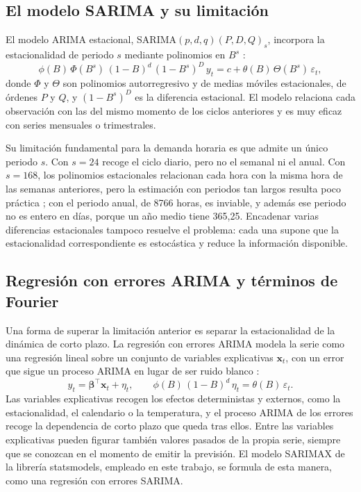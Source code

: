 \subsection{El modelo SARIMA y su limitación}\label{sec:sarima}

El modelo ARIMA estacional, SARIMA$(p,d,q)(P,D,Q)_s$, incorpora la
estacionalidad de periodo $s$ mediante polinomios en $B^s$
\parencite{box2015time}:
\begin{equation}
	\phi(B)\, \Phi(B^s)\, (1 - B)^d\, (1 - B^s)^D\, y_t = c + \theta(B)\, \Theta(B^s)\, \varepsilon_t,
\end{equation}
donde $\Phi$ y $\Theta$ son polinomios autorregresivo y de medias móviles
estacionales, de órdenes $P$ y $Q$, y $(1 - B^s)^D$ es la diferencia
estacional. El modelo relaciona cada observación con las del mismo momento
de los ciclos anteriores y es muy eficaz con series mensuales o trimestrales.

Su limitación fundamental para la demanda horaria es que admite un único
periodo $s$. Con $s = 24$ recoge el ciclo diario, pero no el semanal ni el
anual. Con $s = 168$, los polinomios estacionales relacionan cada hora con la
misma hora de las semanas anteriores, pero la estimación con periodos tan
largos resulta poco práctica \parencite{hyndman2021fpp3}; con el periodo
anual, de 8766 horas, es inviable, y además ese periodo no es entero en
días, porque un año medio tiene 365,25. Encadenar varias diferencias
estacionales tampoco resuelve el problema: cada una supone que la
estacionalidad correspondiente es estocástica y reduce la información
disponible.

\subsection{Regresión con errores ARIMA y términos de Fourier}\label{sec:fourier}

Una forma de superar la limitación anterior es separar la estacionalidad de
la dinámica de corto plazo. La regresión con errores ARIMA modela la serie
como una regresión lineal sobre un conjunto de variables explicativas
$\mathbf{x}_t$, con un error que sigue un proceso ARIMA en lugar de ser ruido
blanco \parencite{hyndman2021fpp3}:
\begin{equation}
	y_t = \boldsymbol{\beta}^{\top} \mathbf{x}_t + \eta_t,
	\qquad \phi(B)\, (1-B)^d\, \eta_t = \theta(B)\, \varepsilon_t.
\end{equation}
Las variables explicativas recogen los efectos deterministas y externos,
como la estacionalidad, el calendario o la temperatura, y el proceso ARIMA
de los errores recoge la dependencia de corto plazo que queda tras ellos.
Entre las variables explicativas pueden figurar también valores pasados de
la propia serie, siempre que se conozcan en el momento de emitir la
previsión. El modelo SARIMAX de la librería statsmodels, empleado en este
trabajo, se formula de esta manera, como una regresión con errores SARIMA.

